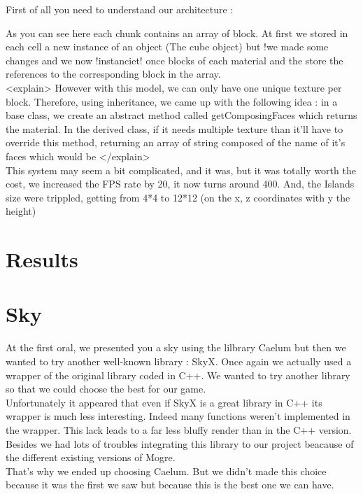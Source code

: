 \documentclass[article]{report} %
\begin{document}
First of all you need to understand our architecture : 

As you can see here each chunk contains an array of block. At first we stored in each cell a new instance of an object (The cube object) but
!we made some changes and we now !instanciet! once blocks of each material and the store the references to the corresponding block in the array.\\
			<explain>
However with this model, we can only have one unique texture per block. Therefore, using inheritance, we came 
up with the following idea : in a base class, we create an abstract method called getComposingFaces which returns the material.
In the derived class, if it needs multiple texture than it'll have to override this method, returning an array of string composed of the name of it's faces which would be 
</explain>\\

This system may seem a bit complicated, and it was, but it was totally worth the cost, we increased the FPS rate by 20, it now turns around 400. And, the Islands size were trippled, getting from 4*4 to 12*12 (on the x, z coordinates with y the height)
			\section{Results}
			
			\section{Sky}
				At the first oral, we presented you a sky using the lilbrary Caelum but then we wanted to try another well-known library : SkyX. Once again we actually used a wrapper of the original library coded in C++. We wanted to try another library so that we could choose the best for our game.\\
				
Unfortunately it appeared that even if SkyX is a great library in C++ its wrapper is much less interesting. Indeed many functions weren't implemented in the wrapper. This lack leads to a far less bluffy render than in the C++ version. Besides we had lots of troubles integrating this library to our project beacause of the different existing versions of Mogre.\\

That's why we ended up choosing Caelum. But we didn't made this choice because it was the first we saw but because this is the best one we can have.
\end{document}
